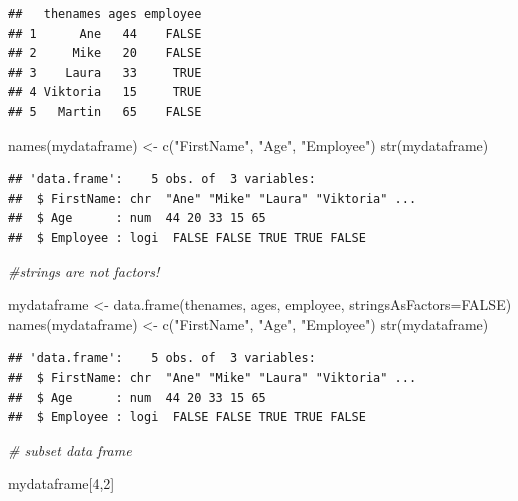 \documentclass[
]{book}
\newenvironment{Shaded}{\begin{snugshade}}{\end{snugshade}}
\newcommand{\AttributeTok}[1]{\textcolor[rgb]{0.77,0.63,0.00}{#1}}
\newcommand{\CommentTok}[1]{\textcolor[rgb]{0.56,0.35,0.01}{\textit{#1}}}
\newcommand{\ConstantTok}[1]{\textcolor[rgb]{0.00,0.00,0.00}{#1}}
\newcommand{\DecValTok}[1]{\textcolor[rgb]{0.00,0.00,0.81}{#1}}
\newcommand{\FunctionTok}[1]{\textcolor[rgb]{0.00,0.00,0.00}{#1}}
\newcommand{\NormalTok}[1]{#1}
\newcommand{\OtherTok}[1]{\textcolor[rgb]{0.56,0.35,0.01}{#1}}
\newcommand{\StringTok}[1]{\textcolor[rgb]{0.31,0.60,0.02}{#1}}
\begin{document}
\begin{verbatim}
##   thenames ages employee
## 1      Ane   44    FALSE
## 2     Mike   20    FALSE
## 3    Laura   33     TRUE
## 4 Viktoria   15     TRUE
## 5   Martin   65    FALSE
\end{verbatim}

\begin{Shaded}
\begin{Highlighting}[]
\FunctionTok{names}\NormalTok{(mydataframe) }\OtherTok{\textless{}{-}} \FunctionTok{c}\NormalTok{(}\StringTok{"FirstName"}\NormalTok{, }\StringTok{"Age"}\NormalTok{, }\StringTok{"Employee"}\NormalTok{)}
\FunctionTok{str}\NormalTok{(mydataframe)}
\end{Highlighting}
\end{Shaded}

\begin{verbatim}
## 'data.frame':    5 obs. of  3 variables:
##  $ FirstName: chr  "Ane" "Mike" "Laura" "Viktoria" ...
##  $ Age      : num  44 20 33 15 65
##  $ Employee : logi  FALSE FALSE TRUE TRUE FALSE
\end{verbatim}

\begin{Shaded}
\begin{Highlighting}[]
\CommentTok{\#strings are not factors!}

\NormalTok{mydataframe }\OtherTok{\textless{}{-}} \FunctionTok{data.frame}\NormalTok{(thenames, ages, employee,}
                          \AttributeTok{stringsAsFactors=}\ConstantTok{FALSE}\NormalTok{)}
\FunctionTok{names}\NormalTok{(mydataframe) }\OtherTok{\textless{}{-}} \FunctionTok{c}\NormalTok{(}\StringTok{"FirstName"}\NormalTok{, }\StringTok{"Age"}\NormalTok{, }\StringTok{"Employee"}\NormalTok{)}
\FunctionTok{str}\NormalTok{(mydataframe)}
\end{Highlighting}
\end{Shaded}

\begin{verbatim}
## 'data.frame':    5 obs. of  3 variables:
##  $ FirstName: chr  "Ane" "Mike" "Laura" "Viktoria" ...
##  $ Age      : num  44 20 33 15 65
##  $ Employee : logi  FALSE FALSE TRUE TRUE FALSE
\end{verbatim}

\begin{Shaded}
\begin{Highlighting}[]
\CommentTok{\# subset data frame}

\NormalTok{mydataframe[}\DecValTok{4}\NormalTok{,}\DecValTok{2}\NormalTok{]}
\end{Highlighting}
\end{Shaded}
\end{document}
